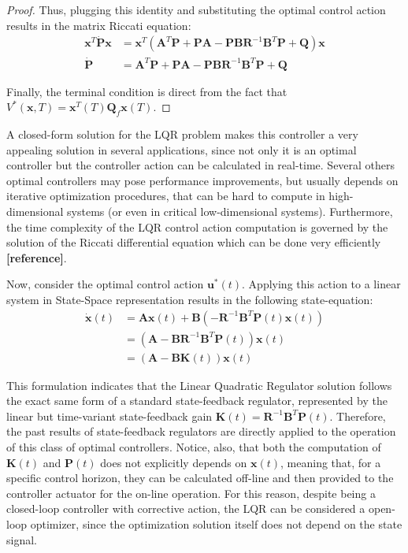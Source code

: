 \documentclass[a4paper,11pt]{book}
\numberwithin{figure}{chapter}
\numberwithin{equation}{chapter}
\numberwithin{table}{chapter}
\theoremstyle{definition}
\begin{document}
\begin{proof}
	Thus, plugging this identity and substituting the optimal control action results in the matrix Riccati equation:
	\begin{equation}
	\begin{split}
	\bm{x}^T \dot{\bm{P}} \bm{x} &= \bm{x}^T (\bm{A}^T \bm{P} + \bm{P} \bm{A} - \bm{P} \bm{B} \bm{R}^{-1} \bm{B}^T \bm{P} + \bm{Q}) \bm{x} \\
	\dot{\bm{P}} &= \bm{A}^T \bm{P} + \bm{P} \bm{A} - \bm{P} \bm{B} \bm{R}^{-1} \bm{B}^T \bm{P} + \bm{Q}
	\end{split}
	\end{equation}
	
	Finally, the terminal condition is direct from the fact that $V^*(\bm{x}, T) = \bm{x}^T(T) \bm{Q}_f \bm{x}(T)$.
\end{proof}

A closed-form solution for the LQR problem makes this controller a very appealing solution in several applications, since not only it is an optimal controller but the controller action can be calculated in real-time. Several others optimal controllers may pose performance improvements, but usually depends on iterative optimization procedures, that can be hard to compute in high-dimensional systems (or even in critical low-dimensional systems). Furthermore, the time complexity of the LQR control action computation is governed by the solution of the Riccati differential equation which can be done very efficiently \textbf{[reference]}.

Now, consider the optimal control action $\bm{u}^*(t)$. Applying this action to a linear system in State-Space representation results in the following state-equation:
\begin{equation}
\begin{split}
	\dot{\bm{x}}(t) &= \bm{A} \bm{x}(t) + \bm{B} \left( -\bm{R}^{-1} \bm{B}^T \bm{P}(t) \bm{x}(t) \right) \\
		& = \left( \bm{A} - \bm{B} \bm{R}^{-1} \bm{B}^T \bm{P}(t) \right) \bm{x}(t) \\
		& = \left( \bm{A} - \bm{B} \bm{K}(t) \right) \bm{x}(t)
\end{split}
\end{equation}

This formulation indicates that the Linear Quadratic Regulator solution follows the exact same form of a standard state-feedback regulator, represented by the linear but time-variant state-feedback gain $\bm{K}(t) = \bm{R}^{-1} \bm{B}^T \bm{P}(t)$. Therefore, the past results of state-feedback regulators are directly applied to the operation of this class of optimal controllers. Notice, also, that both the computation of $\bm{K}(t)$ and $\bm{P}(t)$ does not explicitly depends on $\bm{x}(t)$, meaning that, for a specific control horizon, they can be calculated off-line and then provided to the controller actuator for the on-line operation. For this reason, despite being a closed-loop controller with corrective action, the LQR can be considered a open-loop optimizer, since the optimization solution itself does not depend on the state signal.
\end{document}
